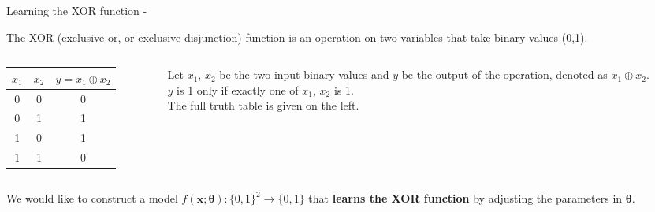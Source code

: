 %
%

\begin{frame}[t,allowframebreaks]{Learning the XOR function -} 

    The XOR (exclusive or, or exclusive disjunction) function
    is an operation on two variables that take binary values (0,1).\\
    \vspace{0.2cm}

    \begin{columns}[t]
        \begin{column}{0.32\textwidth}
            \vspace{-1.2cm}
            \begin{center}
                \begin{tabular}{ c c | c }
                 $x_1$ & $x_2$ & $y = x_1 \oplus x_2$ \\ 
                 \hline
                 0 & 0 & 0 \\  
                 0 & 1 & 1 \\   
                 1 & 0 & 1 \\  
                 1 & 1 & 0 \\   
                \end{tabular}
            \end{center}
        \end{column}
        \begin{column}{0.68\textwidth}
            Let $x_1$, $x_2$ be the two input binary values
            and $y$ be the output of the operation, denoted as $x_1 \oplus x_2$.\\
            \vspace{0.2cm}
            $y$ is 1 only if exactly one of $x_1$, $x_2$ is 1.\\ 
            \vspace{0.2cm}
            The full truth table is given on the left.\\
        \end{column}
    \end{columns}

    \vspace{0.4cm}
    We would like to construct a model 
    $f(\mathbf{x};\mathbf{\theta}):\{0,1\}^2\rightarrow\{0,1\}$ 
    that {\bf learns the XOR function} 
    by adjusting the parameters in $\mathbf{\theta}$.\\


\end{frame}
